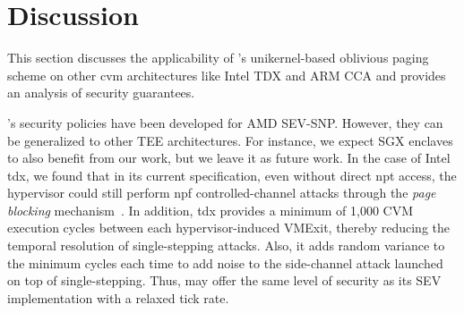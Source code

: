 \section{Discussion}
\label{sec:discussion}
This section discusses the applicability of \thename's unikernel-based oblivious paging scheme on other \gls{cvm} architectures like Intel TDX and ARM CCA and provides an analysis of \thename security guarantees.


\label{sec:discussion:cvms}

\thename's security policies have been developed for AMD SEV-SNP.
However, they can be generalized to other TEE architectures.
For instance, we expect SGX enclaves to also benefit from our work, but we leave it as future work.
In the case of Intel \gls{tdx},  we found that in its current specification, even without direct \gls{npt} access, the hypervisor could still perform \gls{npf} controlled-channel attacks through the \emph{page blocking} mechanism~\cite{tdx}.
In addition, \gls{tdx} provides a minimum of 1,000 CVM execution cycles between each hypervisor-induced VMExit, thereby reducing the temporal resolution of single-stepping attacks.
Also, it adds random variance to the minimum cycles each time to add noise to the side-channel attack launched on top of single-stepping.
Thus, \thename may offer the same level of security as its SEV implementation with a relaxed tick rate.



